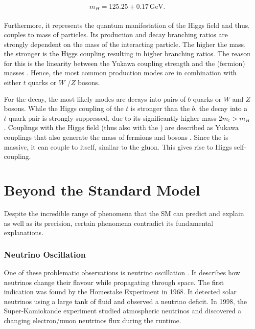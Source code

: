 \documentclass[bachelor,ngerman,english]{GAUBM}
\begin{document}
\begin{gather}
    \begin{aligned}
        m_H=125.25\pm0.17\,\text{GeV}.
        \label{eq:mass_h}
    \end{aligned}
\end{gather}

Furthermore, it represents the quantum manifestation of the Higgs field and thus, couples to mass of particles. Its production and decay branching ratios are strongly dependent on the mass of the interacting particle. The higher the mass, the stronger is the Higgs coupling resulting in higher branching ratios. The reason for this is the linearity between the Yukawa coupling strength and the (fermion) masses \cite{theory:general_sm,theory:general_physics}. Hence, the most common production modes are in combination with either $t$ quarks or $W$ /$Z$ bosons. 

For the decay, the most likely modes are decays into pairs of $b$ quarks or $W$  and $Z$ bosons. While the Higgs coupling of the $t$ is stronger than the $b$, the decay into a $t$ quark pair is strongly suppressed, due to its significantly higher mass $2m_t>m_H$. Couplings with the Higgs field (thus also with the \Hboson) are described as Yukawa couplings that also generate the mass of fermions and bosons \cite{theory:higgs_mechanism_01,theory:higgs_mechanism_03}. Since the \Hboson is massive, it can couple to itself, similar to the gluon. This gives rise to Higgs self-coupling.   



\section{Beyond the Standard Model}
\label{sec:theory:bsm}
Despite the incredible range of phenomena that the SM can predict and explain as well as its precision, certain phenomena contradict its fundamental explanations. 

\subsubsection*{Neutrino Oscillation}
One of these problematic observations is neutrino oscillation \cite{bsm_neutrino_oscillation_01,bsm_neutrino_oscillation_02,bsm_neutrino_oscillation_03}. It describes how neutrinos change their flavour while propagating through space. The first indication was found by the Homestake Experiment in 1968. It detected solar neutrinos using a large tank of fluid and observed a neutrino deficit. In 1998, the Super-Kamiokande experiment studied atmospheric neutrinos and discovered a changing electron/muon neutrinos flux during the runtime. 
\end{document}
